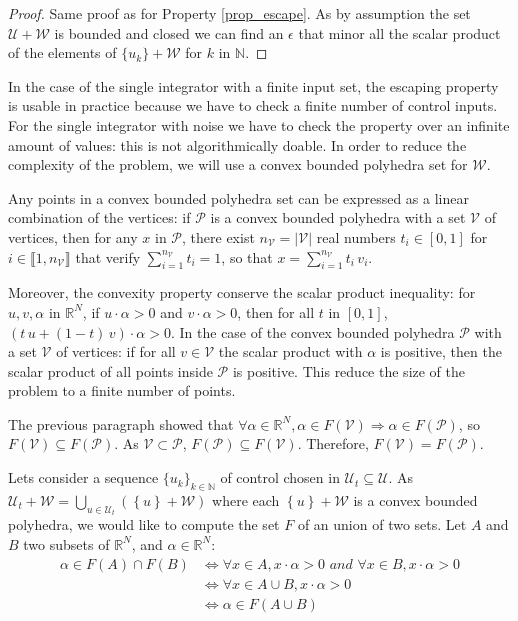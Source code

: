 \begin{proof}
Same proof as for Property \ref{prop_escape}. As by assumption the set $\mathcal{U} + \mathcal{W}$ is bounded and closed we can find an $\epsilon$ that minor all the scalar product of the elements of $\{u_k\} + \mathcal{W}$ for $k$ in $\mathbb{N}$.
\end{proof}

In the case of the single integrator with a finite input set, the escaping property is usable in practice because we have to check a finite number of control inputs.
For the single integrator with noise we have to check the property over an infinite amount of values: this is not algorithmically doable.
In order to reduce the complexity of the problem, we will use a convex bounded polyhedra set for $\mathcal{W}$.

Any points in a convex bounded polyhedra set can be expressed as a linear combination of the vertices: if $\mathcal{P}$ is a convex bounded polyhedra with a set $\mathcal{V}$ of vertices, then for any $x$ in $\mathcal{P}$, there exist $n_{\mathcal{V}} = \left | \mathcal{V} \right |$ real numbers $t_i \in [0,1]$ for $i \in \llbracket 1,n_{\mathcal{V}} \rrbracket$ that verify $\sum_{i=1}^{n_{\mathcal{V}}} t_i = 1$, so that $x = \sum_{i=1}^{n_{\mathcal{V}}} t_i \, v_i$.

Moreover, the convexity property conserve the scalar product inequality: for $u,v,\alpha$ in $\mathbb{R}^N$, if  $u \cdot \alpha > 0$ and $v \cdot \alpha > 0$, then for all $t$ in $[0,1]$, $ (t \, u + (1-t) \, v ) \cdot \alpha> 0$.
In the case of the convex bounded polyhedra $\mathcal{P}$ with a set $\mathcal{V}$ of vertices: if for all $v \in \mathcal{V}$ the scalar product with $\alpha$ is positive, then the scalar product of all points inside $\mathcal{P}$ is positive. This reduce the size of the problem to a finite number of points.

The previous paragraph showed that $\forall \alpha \in \mathbb{R}^N, \alpha \in F(\mathcal{V}) \Rightarrow \alpha \in F(\mathcal{P})$, so $F(\mathcal{V}) \subseteq F(\mathcal{P})$. As $\mathcal{V} \subset \mathcal{P}$, $F(\mathcal{P}) \subseteq F(\mathcal{V})$. Therefore, $F(\mathcal{V}) = F(\mathcal{P})$.

Lets consider a sequence $\{u_k\}_{k \in \mathbb{N}}$ of control chosen in  $\mathcal{U}_t \subseteq \mathcal{U}$.
As $\mathcal{U}_t + \mathcal{W} = \bigcup_{ u \in \mathcal{U}_t}\left ( \left \{ u \right\} + \mathcal{W} \right )$ where each $\left \{ u \right\} + \mathcal{W}$ is a convex bounded polyhedra, we would like to compute the set $F$ of an union of two sets.
Let $A$ and $B$ two subsets of $\mathbb{R}^N$, and $\alpha \in\mathbb{R}^N$:
\begin{equation}\label{Funion}
\begin{aligned}
  \alpha \in F(A) \cap F(B) & \Leftrightarrow \forall x \in A,x \cdot \alpha > 0 \textit{ and } \forall x \in B,x \cdot \alpha > 0
  \\ & \Leftrightarrow \forall x \in A \cup B,x \cdot \alpha > 0
  \\ & \Leftrightarrow \alpha \in F(A \cup B)
\end{aligned}
\end{equation}

